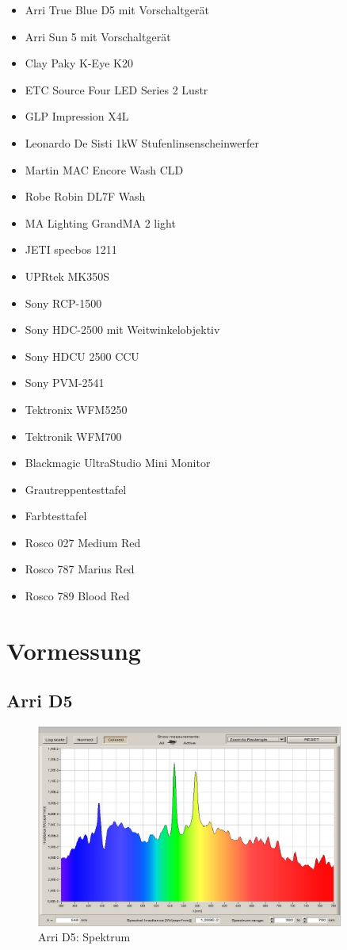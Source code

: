 \begin{itemize}
\item Arri True Blue D5 mit Vorschaltgerät
\item Arri Sun 5 mit Vorschaltgerät
\item Clay Paky K-Eye K20
\item ETC Source Four LED Series 2 Lustr
\item GLP Impression X4L
\item Leonardo De Sisti 1kW Stufenlinsenscheinwerfer
\item Martin MAC Encore Wash CLD
\item Robe Robin DL7F Wash
\item MA Lighting GrandMA 2 light
\item JETI specbos 1211
\item UPRtek MK350S
\item Sony RCP-1500
\item Sony HDC-2500 mit Weitwinkelobjektiv
\item Sony HDCU 2500 CCU
\item Sony PVM-2541
\item Tektronix WFM5250 
\item Tektronik WFM700
\item Blackmagic UltraStudio Mini Monitor
\item Grautreppentesttafel
\item Farbtesttafel
\item Rosco 027 \glqq Medium Red\grqq\
\item Rosco 787 \glqq Marius Red\grqq\
\item Rosco 789 \glqq Blood Red\grqq\
\end{itemize}


\section{Vormessung}

\subsection{Arri D5}

\begin{figure}[htp]     %
\centering
\includegraphics[width=0.9\textwidth]{vormessung/arriD5vorspec} 
\caption {Arri D5: Spektrum} 
\end{figure}

